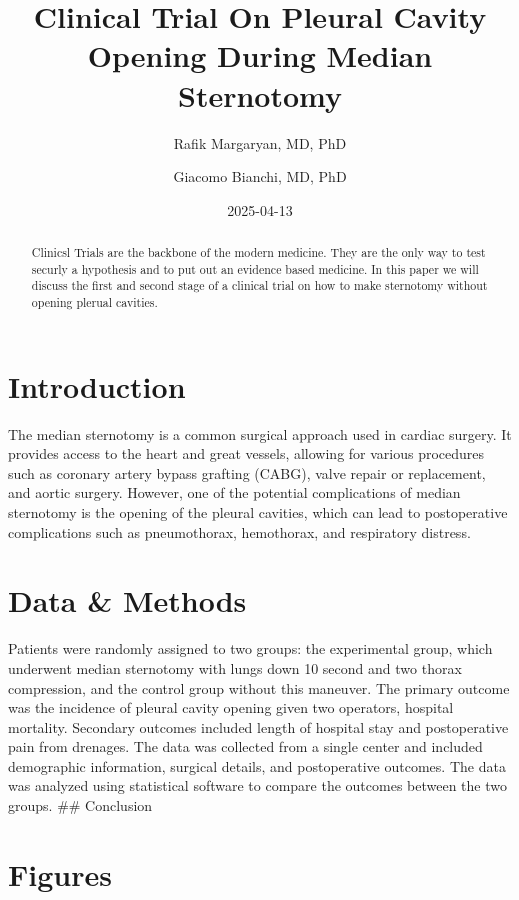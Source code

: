 \documentclass[
  letterpaper,
  DIV=11,
  numbers=noendperiod]{scrartcl}
\title{Clinical Trial On Pleural Cavity Opening During Median
Sternotomy}
\author{Rafik Margaryan, MD, PhD \and Giacomo Bianchi, MD, PhD}
\date{2025-04-13}
\begin{document}
\maketitle
\begin{abstract}
Clinicsl Trials are the backbone of the modern medicine. They are the
only way to test securly a hypothesis and to put out an evidence based
medicine. In this paper we will discuss the first and second stage of a
clinical trial on how to make sternotomy without opening plerual
cavities.
\end{abstract}


\section{Introduction}\label{introduction}

The median sternotomy is a common surgical approach used in cardiac
surgery. It provides access to the heart and great vessels, allowing for
various procedures such as coronary artery bypass grafting (CABG), valve
repair or replacement, and aortic surgery. However, one of the potential
complications of median sternotomy is the opening of the pleural
cavities, which can lead to postoperative complications such as
pneumothorax, hemothorax, and respiratory distress.

\section{Data \& Methods}\label{sec-data-methods}

Patients were randomly assigned to two groups: the experimental group,
which underwent median sternotomy with lungs down 10 second and two
thorax compression, and the control group without this maneuver. The
primary outcome was the incidence of pleural cavity opening given two
operators, hospital mortality. Secondary outcomes included length of
hospital stay and postoperative pain from drenages. The data was
collected from a single center and included demographic information,
surgical details, and postoperative outcomes. The data was analyzed
using statistical software to compare the outcomes between the two
groups. \#\# Conclusion

\section{Figures}\label{figures}
\end{document}
